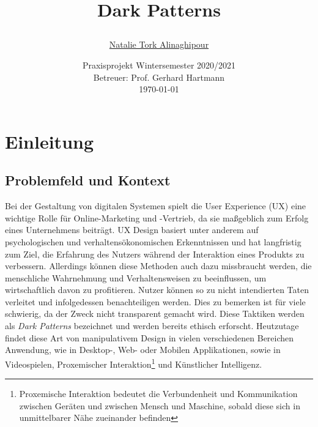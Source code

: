 \documentclass[a4paper]{article}
\begin{document}
	\title{
	\begin{figure}[!ht]
	\end{figure}
	\vspace{1cm}
	\Huge Dark Patterns
	}
	
	\vspace{1cm}

	

	\author{\Large \href{mailto:natalie.tork_alinaghipour@smail.th-koeln.de}{Natalie Tork Alinaghipour} 
	\vspace{1cm}}
	
	\date{
	\large Praxisprojekt Wintersemester 2020/2021 \\ 
	\vspace{0.8cm}
	\large Betreuer: Prof. Gerhard Hartmann \\
	\vspace{1cm}
	\today
	}

	\maketitle
	\setlength{\parindent}{0pt}

\vspace{2cm}
\begin{abstract}


\end{abstract}
	\newpage
	\tableofcontents
	\newpage
	
\section{Einleitung} 
\label{sec:einleitung}

\subsectionfont{\MakeUppercase}
\subsection{Problemfeld und Kontext}
\label{sub:problemfeld_und_kontext}
Bei der Gestaltung von digitalen Systemen spielt die User Experience (UX) eine wichtige Rolle für Online-Marketing und -Vertrieb, da sie maßgeblich zum Erfolg eines Unternehmens beiträgt. UX Design basiert unter anderem auf psychologischen und verhaltensökonomischen Erkenntnissen und hat langfristig zum Ziel, die Erfahrung des Nutzers während der Interaktion eines Produkts zu verbessern. Allerdings können diese Methoden auch dazu missbraucht werden, die menschliche Wahrnehmung und Verhaltensweisen zu beeinflussen, um wirtschaftlich davon zu profitieren. Nutzer können so zu nicht intendierten Taten verleitet und infolgedessen benachteiligen werden. Dies zu bemerken ist für viele schwierig, da der Zweck nicht transparent gemacht wird.
Diese Taktiken werden als \textit{Dark Patterns} bezeichnet und werden bereits ethisch erforscht. Heutzutage findet diese Art von manipulativem Design in vielen verschiedenen Bereichen Anwendung, wie in Desktop-, Web- oder Mobilen Applikationen, sowie in Videospielen, Proxemischer Interaktion\footnote{\label{foot:1} Proxemische Interaktion bedeutet die Verbundenheit und Kommunikation zwischen Geräten und zwischen Mensch und Maschine, sobald diese sich in unmittelbarer Nähe zueinander befinden} und Künstlicher Intelligenz. 
\end{document}
